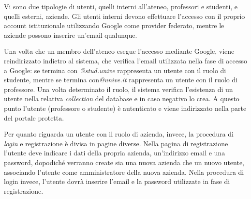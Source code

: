 \noindent
Vi sono due tipologie di utenti, quelli interni all'ateneo, professori e studenti, e quelli esterni, aziende. Gli utenti interni devono effettuare l'accesso con il proprio account istituzionale utilizzando Google come provider federato, mentre le aziende possono inserire un'email qualunque. 

Una volta che un membro dell'ateneo esegue l'accesso mediante Google, viene reindirizzato indietro al sistema, che verifica l'email utilizzata nella fase di accesso a Google: se termina con \textit{@stud.unive} rappresenta un utente con il ruolo di studente, mentre se termina con\textit{@unive.it} rappresenta un utente con il ruolo di professore. Una volta determinato il ruolo, il sistema verifica l'esistenza di un utente nella relativa \textit{collection} del database e in caso negativo lo crea. A questo punto l'utente (professore o studente) è autenticato e viene indirizzato nella parte del portale protetta.

Per quanto riguarda un utente con il ruolo di azienda, invece, la procedura di \textit{login} e registrazione è divisa in pagine diverse. Nella pagina di registrazione l'utente deve indicare i dati della propria azienda, un'indirizzo email e una password, dopodiché verranno create sia una nuova azienda che un nuovo utente, associando l'utente come amministratore della nuova azienda. Nella procedura di login invece, l'utente dovrà inserire l'email e la password utilizzate in fase di registrazione.

